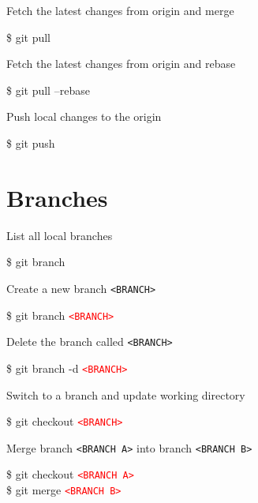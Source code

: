 \documentclass[10pt,a4paper]{article}
\newenvironment{cheatentry}{%
    \noindent%
    \begin{minipage}{\columnwidth}%
    \small%
    \noindent%
}{%
    \end{minipage}%
}
\newenvironment{cheatcmde}{%
    \noindent%
    \begin{cmdbox}%
    \begin{flushleft}%
    \bgroup%
    \setlength{\parindent}{-12pt}%
    \ttfamily\fontseries{b}\selectfont\large%
    \hspace{\parindent}%
}{%
    \egroup%
    \end{flushleft}%
    \end{cmdbox}%
}
\newcommand{\entrysep}{\vspace{1em}}
\newcommand{\cheatcmd}[1]{%
    \begin{cheatcmde}#1\end{cheatcmde}
}
\newcommand{\cheatmetavar}[1]{%
    \textcolor{red}{\texttt{\textless{}#1\textgreater{}}}%
}
\newcommand{\cheatmetavarref}[1]{%
    {\texttt{\textless{}#1\textgreater{}}}%
}
\begin{document}
\begin{multicols}{4}
\entrysep{}%

\begin{cheatentry}%
Fetch the latest changes from origin and merge
\cheatcmd{\$ git pull}
\end{cheatentry}

\entrysep{}%

\begin{cheatentry}%
Fetch the latest changes from origin and rebase
\cheatcmd{\$ git pull --rebase}
\end{cheatentry}

\entrysep{}%

\begin{cheatentry}%
Push local changes to the origin
\cheatcmd{\$ git push}
\end{cheatentry}

\section*{Branches}

\begin{cheatentry}%
List all local branches
\cheatcmd{\$ git branch}
\end{cheatentry}%

\entrysep{}%

\begin{cheatentry}%
Create a new branch \cheatmetavarref{BRANCH}
\cheatcmd{\$ git branch \cheatmetavar{BRANCH}}
\end{cheatentry}%

\entrysep{}%

\begin{cheatentry}%
Delete the branch called \cheatmetavarref{BRANCH}
\cheatcmd{\$ git branch -d \cheatmetavar{BRANCH}}
\end{cheatentry}

\entrysep{}%

\begin{cheatentry}%
Switch to a branch and update working directory
\cheatcmd{\$ git checkout \cheatmetavar{BRANCH}}
\end{cheatentry}

\entrysep{}%

\begin{cheatentry}%
Merge branch \cheatmetavarref{BRANCH~A} into branch \cheatmetavarref{BRANCH~B}
\cheatcmd{\$ git checkout \cheatmetavar{BRANCH~A}\\\$ git merge \cheatmetavar{BRANCH~B}}
\end{cheatentry}


\end{multicols}
\end{document}
